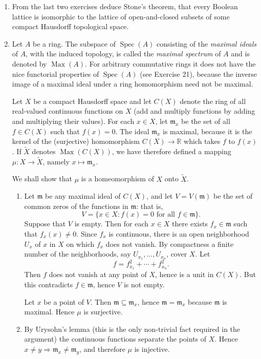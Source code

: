 \begin{enumerate}
\item From the last two exercises deduce Stone's theorem, that every Boolean lattice is isomorphic to the lattice of open-and-closed subsets of some compact Hausdorff topological space.

\item Let $A$ be a ring. The subspace of $\operatorname{Spec}(A)$ consisting of the \textit{maximal ideals} of $A$, with the induced topology, is called the \textit{maximal spectrum} of $A$ and is denoted by $\operatorname{Max}(A)$. For arbitrary commutative rings it does not have the nice functorial properties of $\operatorname{Spec}(A)$ (see Exercise 21), because the inverse image of a maximal ideal under a ring homomorphism need not be maximal.

Let $X$ be a compact Hausdorff space and let $C(X)$ denote the ring of all real-valued continuous functions on $X$ (add and multiply functions by adding and multiplying their values). For each $x\in X$, let $\mathfrak m_x$ be the set of all $f\in C(X)$ such that $f(x)=0$. The ideal $\mathfrak m_x$ is maximal, because it is the kernel of the (surjective) homomorphism $C(X)\longrightarrow\mathbb R$ which takes $f$ to $f(x)$. If $\widetilde X$ denotes $\operatorname{Max}(C(X))$, we have therefore defined a mapping $\mu:X\longrightarrow\widetilde X$, namely $x\mapsto\mathfrak m_x$.

We shall show that $\mu$ is a homeomorphism of $X$ onto $\widetilde X$.
\begin{enumerate}
\renewcommand{\labelenumii}{\roman{enumii})}
\item Let $\mathfrak m$ be any maximal ideal of $C(X)$, and let $V=V(\mathfrak m)$ be the set of common zeros of the functions in $\mathfrak m$: that is,
\[
 V=\{x\in X:f(x)=0\text{ for all }f\in\mathfrak m\}.
\]
Suppose that $V$ is empty. Then for each $x\in X$ there exists $f_x\in\mathfrak m$ such that $f_x(x)\neq0$. Since $f_x$ is continuous, there is an open neighborhood $U_x$ of $x$ in $X$ on which $f_x$ does not vanish. By compactness a finite number of the neighborhoods, say $U_{x_1},\ldots,U_{x_n}$, cover $X$. Let
\[
 f=f_{x_1}^2+\cdots+f_{x_n}^2.
\]
Then $f$ does not vanish at any point of $X$, hence is a unit in $C(X)$. But this contradicts $f\in\mathfrak m$, hence $V$ is not empty.

Let $x$ be a point of $V$. Then $\mathfrak m\subseteq\mathfrak m_x$, hence $\mathfrak m=\mathfrak m_x$ because $\mathfrak m$ is maximal. Hence $\mu$ is surjective.

\item By Urysohn's lemma (this is the only non-trivial fact required in the argument) the continuous functions separate the points of $X$. Hence $x\neq y\Rightarrow\mathfrak m_x\neq\mathfrak m_y$, and therefore $\mu$ is injective.


\end{enumerate}
\end{enumerate}
